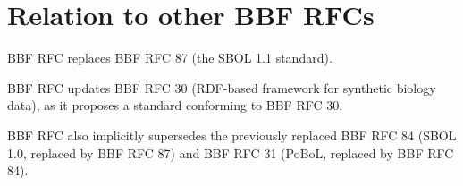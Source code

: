 \section{Relation to other BBF RFCs}


BBF RFC \rfcnum{} replaces BBF RFC 87 (the SBOL 1.1 standard).

BBF RFC \rfcnum{} updates BBF RFC 30 (RDF-based framework for synthetic biology data), as it proposes a standard conforming to BBF RFC 30.

BBF RFC \rfcnum{} also implicitly supersedes the previously replaced BBF RFC 84 (SBOL 1.0, replaced by BBF RFC 87) and BBF RFC 31 (PoBoL, replaced by BBF RFC 84).